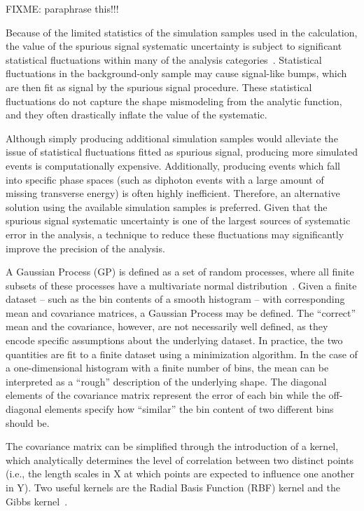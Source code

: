FIXME: paraphrase this!!!

Because of the limited statistics of the simulation samples used in the calculation, the value
of the spurious signal systematic uncertainty is subject to significant statistical fluctuations within
many of the analysis categories~\cite{Hyneman:2712576}. Statistical fluctuations in the background-only sample may cause
signal-like bumps, which are then fit as signal by the spurious signal procedure. These statistical fluctuations do
not capture the shape mismodeling from the analytic function, and they often drastically inflate the
value of the systematic.

Although simply producing additional simulation samples would alleviate the issue of statistical
fluctuations fitted as spurious signal, producing more simulated events is computationally
expensive. Additionally, producing events which fall into specific phase spaces (such as diphoton
events with a large amount of missing transverse energy) is often highly inefficient. Therefore, an
alternative solution using the available simulation samples is preferred. Given that the spurious
signal systematic uncertainty is one of the largest sources of systematic error in the analysis, a
technique to reduce these fluctuations may significantly improve the precision of the analysis.

A Gaussian Process (GP) is defined as a set of random processes, where all finite subsets of these
processes have a multivariate normal distribution~\cite{ebden2015gaussian}. 
Given a finite dataset – such as the bin contents of a smooth histogram – with corresponding
mean and covariance matrices, a Gaussian Process may be defined. The “correct” mean and the
covariance, however, are not necessarily well defined, as they encode specific assumptions about
the underlying dataset. In practice, the two quantities are fit to a finite dataset using a minimization
algorithm. In the case of a one-dimensional histogram with a finite number of bins, the mean can
be interpreted as a “rough” description of the underlying shape. The diagonal elements of the
covariance matrix represent the error of each bin while the off-diagonal elements specify
how “similar” the bin content of two different bins should be.

The covariance matrix can be simplified through the introduction of a kernel, which analytically
determines the level of correlation between two distinct points (i.e., the length scales in X at which points are expected to influence one another in Y). Two useful kernels are the Radial Basis Function (RBF) kernel and the Gibbs kernel~\cite{3569,Gibbs}. 

